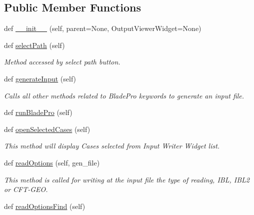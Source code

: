 \subsection*{Public Member Functions}
\begin{DoxyCompactItemize}
\item 
def \hyperlink{classbladepro__modules_1_1inputfile__writer_1_1_input_writer_window_a8b9718669dac6016ebe4e4f27421c7f2}{\+\_\+\+\_\+init\+\_\+\+\_\+} (self, parent=None, Output\+Viewer\+Widget=None)
\item 
def \hyperlink{classbladepro__modules_1_1inputfile__writer_1_1_input_writer_window_a15eb2b878a78d644c96b19a5785d5428}{select\+Path} (self)
\begin{DoxyCompactList}\small\item\em Method accessed by select path button. \end{DoxyCompactList}\item 
def \hyperlink{classbladepro__modules_1_1inputfile__writer_1_1_input_writer_window_a6ec74acbc44de3023188ddd8395b5b30}{generate\+Input} (self)
\begin{DoxyCompactList}\small\item\em Calls all other methods related to Blade\+Pro keywords to generate an input file. \end{DoxyCompactList}\item 
def \hyperlink{classbladepro__modules_1_1inputfile__writer_1_1_input_writer_window_a4f95b1c85e601bde79e5d4e1a526ef8b}{run\+Blade\+Pro} (self)
\item 
def \hyperlink{classbladepro__modules_1_1inputfile__writer_1_1_input_writer_window_af311095fe10adcca5237385033dfe67b}{open\+Selected\+Cases} (self)
\begin{DoxyCompactList}\small\item\em This method will display Cases selected from Input Writer Widget list. \end{DoxyCompactList}\item 
def \hyperlink{classbladepro__modules_1_1inputfile__writer_1_1_input_writer_window_a7f4b3856d4dc973878dcbfd7697018bb}{read\+Options} (self, gen\+\_\+file)
\begin{DoxyCompactList}\small\item\em This method is called for writing at the input file the type of reading, I\+BL, I\+B\+L2 or C\+F\+T-\/\+G\+EO. \end{DoxyCompactList}\item 
def \hyperlink{classbladepro__modules_1_1inputfile__writer_1_1_input_writer_window_a3b0f9f0d1af5015219f258ad0751c778}{read\+Options\+Find} (self)

\end{DoxyCompactItemize}
